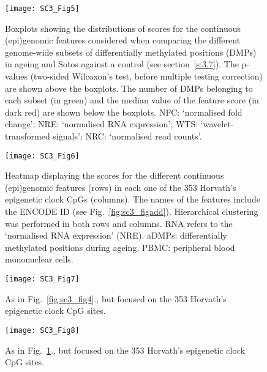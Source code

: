 \begin{figure}[htbp!] 
	\centering    
	\texttt{[image: SC3\_Fig5]}
	\caption[Distributions of scores for the continuous (epi)genomic features in Sotos and ageing: genome-wide]{Boxplots showing the distributions of scores for the continuous (epi)genomic features considered when comparing the different genome-wide subsets of differentially methylated positions (DMPs) in ageing and Sotos against a control (see section~\ref{s:3.7}). The p-values (two-sided Wilcoxon's test, before multiple testing correction) are shown above the boxplots. The number of DMPs belonging to each subset (in green) and the median value of the feature score (in dark red) are shown below the boxplots. \acrshort{NFC}: `normalised fold change'; \acrshort{NRE}: `normalised RNA expression'; \acrshort{WTS}: `wavelet-transformed signals'; \acrshort{NRC}: `normalised read counts'.}
	\label{fig:sc3_fig5}
\end{figure}

\begin{figure}[htbp!] 
	\centering    
	\texttt{[image: SC3\_Fig6]}
	\vspace*{1 mm}
	\caption[Scores for the continuous (epi)genomic features in the Horvath's epigenetic clock CpGs]{Heatmap displaying the scores for the different continuous (epi)genomic features (rows) in each one of the 353 Horvath's epigenetic clock CpGs (columns). The names of the features include the ENCODE ID (see Fig.~\ref{fig:sc3_figadd}). Hierarchical clustering was performed in both rows and columns. RNA refers to the `normalised RNA expression' (NRE). aDMPs: differentially methylated positions during ageing. PBMC: peripheral blood mononuclear cells.}
	\label{fig:sc3_fig6}
\end{figure}

\begin{figure}[htbp!] 
	\centering    
	\texttt{[image: SC3\_Fig7]}
	\caption[Enrichment for the categorical (epi)genomic features in Sotos and ageing: Horvath's epigenetic clock]{As in Fig.~\ref{fig:sc3_fig4}., but focused on the 353 Horvath's epigenetic clock CpG sites.}
	\label{fig:sc3_fig7}
\end{figure}

\begin{figure}[htbp!] 
	\centering    
	\texttt{[image: SC3\_Fig8]}
	\caption[Distributions of scores for the continuous (epi)genomic features in Sotos and ageing: Horvath's epigenetic clock]{As in Fig.~\ref{fig:sc3_fig5}., but focused on the 353 Horvath's epigenetic clock CpG sites.}
	\label{fig:sc3_fig8}
\end{figure}


